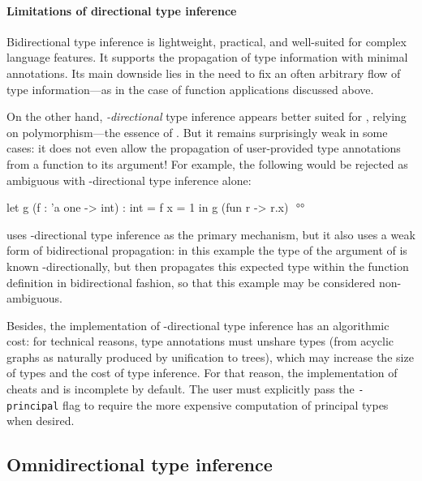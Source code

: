 \documentclass[acmsmall,screen,nonacm,review]{acmart}
\begin{document}
\paragraph{Limitations of directional type inference}

Bidirectional type inference is lightweight, practical, and well-suited for
complex language features. It supports the propagation of type information with
minimal annotations. Its main downside lies in the need to fix an often
arbitrary flow of type information---as in the case of function applications
discussed above.

On the other hand, \emph{\Geninst-directional} type inference appears better
suited for \ML, relying on polymorphism---the essence of \ML. But it remains
surprisingly weak in some cases: it does not even allow the propagation of
user-provided type annotations from a function to its argument! For example,
the following would be rejected as ambiguous with \geninst-directional type
inference alone:
\begin{program}[input]
let g (f : 'a one -> int) : int = f {x = 1} in g (fun r -> r.x) $
$ °°
\end{program}

\OCaml uses \geninst-directional type inference as the primary mechanism, but
it also uses a weak form of bidirectional propagation: in this example the type
of the argument of  is known \Geninst-directionally, but \OCaml then
propagates this expected type within the function definition in bidirectional
fashion, so that this example may be considered non-ambiguous.

Besides, the implementation of \geninst-directional type inference has an
algorithmic cost: for technical reasons, type annotations must unshare
types (from acyclic graphs as naturally produced by unification to trees),
which may increase the size of types and the cost of type inference. For
that reason, the implementation of \OCaml cheats and is incomplete by
default. The user must explicitly pass the \texttt{\small -principal} flag to
require the more expensive computation of principal types when desired.

\subsection{Omnidirectional type inference}
\end{document}
